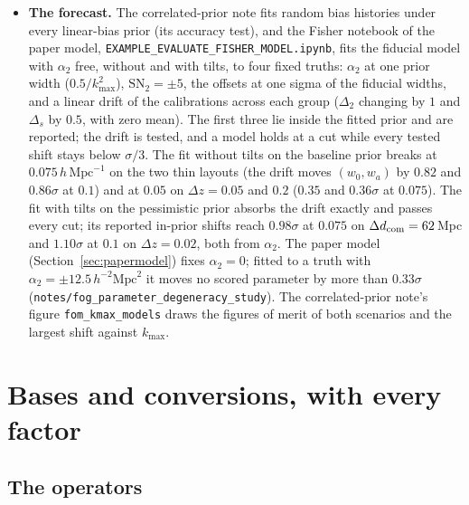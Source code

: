 \documentclass[11pt]{article}
\newcommand{\kmax}{k_{\mathrm{max}}}
\newcommand{\hMpc}{\,h\,\mathrm{Mpc}^{-1}}
\newcommand{\aunit}{\,h^{-2}\mathrm{Mpc}^2}
\newcommand{\SNt}{\mathrm{SN}_2}
\begin{document}
\begin{itemize}
each group amplitude (the correlated-prior note, on its numerical
checks).
\item \textbf{The forecast.}  The correlated-prior note fits random
bias histories under every linear-bias prior (its accuracy test), and
the Fisher notebook of the paper model,
\texttt{EXAMPLE\_EVALUATE\_FISHER\_MODEL.ipynb}, fits the fiducial
model with $\alpha_2$ free, without and with tilts, to four fixed
truths: $\alpha_2$ at one prior width
($0.5/\kmax^2$), $\SNt = \pm5$, the offsets at one sigma of the
fiducial
widths, and a linear drift of the calibrations across each group
($\Delta_2$ changing by $1$ and $\Delta_s$ by $0.5$, with zero mean).
The first three lie inside the fitted prior and are reported; the
drift is tested, and a model holds at a cut while every tested shift
stays below $\sigma/3$.  The fit without tilts on the baseline prior
breaks at
$0.075\hMpc$ on the two thin layouts (the drift moves $(w_0, w_a)$ by
$0.82$ and $0.86\sigma$ at $0.1$) and at $0.05$ on $\Delta z = 0.05$
and $0.2$ ($0.35$ and $0.36\sigma$ at $0.075$).  The fit with tilts on
the pessimistic prior absorbs the drift exactly and passes every cut;
its reported in-prior shifts reach $0.98\sigma$ at $0.075$ on
$\Delta d_{\rm com} = 62$\,Mpc and $1.10\sigma$ at $0.1$ on
$\Delta z = 0.02$, both from $\alpha_2$.  The paper model
(Section~\ref{sec:papermodel}) fixes $\alpha_2 = 0$; fitted to a truth
with $\alpha_2 = \pm12.5\aunit$ it moves no scored parameter by more
than $0.33\sigma$ (\texttt{notes/fog\_parameter\_degeneracy\_study}).
The correlated-prior note's figure \texttt{fom\_kmax\_models} draws
the figures of merit of both scenarios and the largest shift against
$\kmax$.
\end{itemize}

\appendix

\section{Bases and conversions, with every factor}
\label{app:conversions}

\subsection{The operators}
\end{document}

